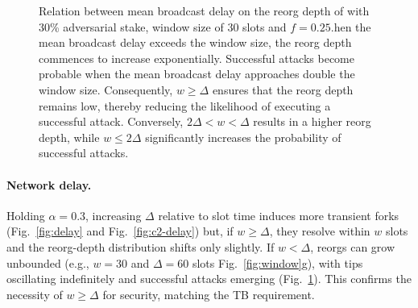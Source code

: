 \begin{figure}[htbp!]
\caption{Relation between mean broadcast delay on the reorg depth of \ProjBase with 30\% adversarial stake, window size of 30 slots and $f=0.25$.hen the mean broadcast delay exceeds the window size, the reorg depth commences to increase exponentially. Successful attacks become probable when the mean broadcast delay approaches double the window size. Consequently, $w \geq \Delta$ ensures that the reorg depth remains low, thereby reducing the likelihood of executing a successful attack. Conversely, $2\Delta < w < \Delta$ results in a higher reorg depth, while $w \leq 2\Delta$ significantly increases the probability of successful attacks.}
\label{fig:window-attack}
\end{figure}

\paragraph{Network delay.}
Holding $\alpha=0.3$, increasing $\Delta$ relative to slot time induces more transient forks (Fig.~\ref{fig:delay} and Fig.~\ref{fig:c2-delay}) but, if $w\ge\Delta$, they resolve within $w$ slots and the reorg-depth distribution shifts only slightly. If $w<\Delta$, reorgs can grow unbounded (e.g., $w=30$ and $\Delta=60$ slots Fig.~\ref{fig:window}g), with tips oscillating indefinitely and successful attacks emerging (Fig.~\ref{fig:window-attack}). This confirms the necessity of $w\ge\Delta$ for security, matching the TB requirement.

